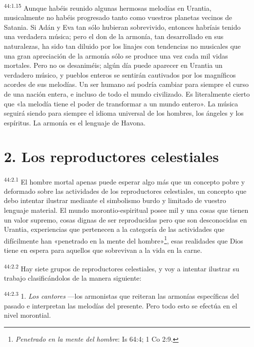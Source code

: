 \par
\textsuperscript{44:1.15} Aunque habéis reunido algunas hermosas melodías en Urantia, musicalmente no habéis progresado tanto como vuestros planetas vecinos de Satania. Si Adán y Eva tan sólo hubieran sobrevivido, entonces habríais tenido una verdadera música; pero el don de la armonía, tan desarrollado en sus naturalezas, ha sido tan diluido por los linajes con tendencias no musicales que una gran apreciación de la armonía sólo se produce una vez cada mil vidas mortales. Pero no os desaniméis; algún día puede aparecer en Urantia un verdadero músico, y pueblos enteros se sentirán cautivados por los magníficos acordes de sus melodías. Un ser humano así podría cambiar para siempre el curso de una nación entera, e incluso de todo el mundo civilizado. Es literalmente cierto que «la melodía tiene el poder de transformar a un mundo entero». La música seguirá siendo para siempre el idioma universal de los hombres, los ángeles y los espíritus. La armonía es el lenguaje de Havona.

\section*{2. Los reproductores celestiales}
\par
\textsuperscript{44:2.1} El hombre mortal apenas puede esperar algo más que un concepto pobre y deformado sobre las actividades de los reproductores celestiales, un concepto que debo intentar ilustrar mediante el simbolismo burdo y limitado de vuestro lenguaje material. El mundo morontio-espiritual posee mil y una cosas que tienen un valor supremo, cosas dignas de ser reproducidas pero que son desconocidas en Urantia, experiencias que pertenecen a la categoría de las actividades que difícilmente han «penetrado en la mente del hombre»\footnote{\textit{Penetrado en la mente del hombre}: Is 64:4; 1 Co 2:9.}, esas realidades que Dios tiene en espera para aquellos que sobrevivan a la vida en la carne.

\par
\textsuperscript{44:2.2} Hay siete grupos de reproductores celestiales, y voy a intentar ilustrar su trabajo clasificándolos de la manera siguiente:

\par
\textsuperscript{44:2.3} 1. \textit{Los cantores} ---los armonistas que reiteran las armonías específicas del pasado e interpretan las melodías del presente. Pero todo esto se efectúa en el nivel morontial.


